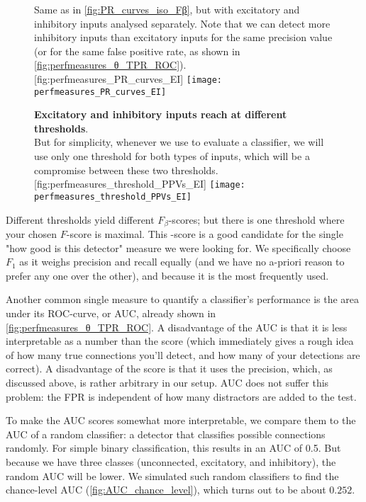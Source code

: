 \begin{figure}
    \begin{sidecaption}
        {Same as in \cref{fig:PR_curves_iso_Fβ}, but with excitatory and inhibitory inputs analysed separately. Note that we can detect more inhibitory inputs than excitatory inputs for the same precision value (or for the same false positive rate, as shown in \cref{fig:perfmeasures_θ_TPR_ROC}).}
        [fig:perfmeasures_PR_curves_EI]
        \texttt{[image: perfmeasures\_PR\_curves\_EI]}
    \end{sidecaption}
\end{figure}

\begin{figure}
    \begin{sidecaption}
        {\textbf{Excitatory and inhibitory inputs reach \maxF at different thresholds}.\\
        But for simplicity, whenever we use \maxF to evaluate a classifier, we will use only one threshold for both types of inputs, which will be a compromise between these two thresholds.}
        [fig:perfmeasures_threshold_PPVs_EI]
        \texttt{[image: perfmeasures\_threshold\_PPVs\_EI]}
    \end{sidecaption}
\end{figure}

Different thresholds yield different $F_β$-scores; but there is one threshold where your chosen $F$-score is maximal. This \maxF-score is a good candidate for the single "how good is this detector" measure we were looking for. We specifically choose $F_1$ as it weighs precision and recall equally (and we have no a-priori reason to prefer any one over the other), and because it is the most frequently used.

Another common single measure to quantify a classifier's performance is the area under its ROC-curve, or AUC, already shown in \cref{fig:perfmeasures_θ_TPR_ROC}. A disadvantage of the AUC is that it is less interpretable as a number than the \maxF score (which immediately gives a rough idea of how many true connections you'll detect, and how many of your detections are correct).
A disadvantage of the \maxF score is that it uses the precision, which, as discussed above, is rather arbitrary in our setup. AUC does not suffer this problem: the FPR is independent of how many distractors are added to the test.

To make the AUC scores somewhat more interpretable, we compare them to the AUC of a random classifier: a detector that classifies possible connections randomly. For simple binary classification, this results in an AUC of 0.5. But because we have three classes (unconnected, excitatory, and inhibitory), the random AUC will be lower. We simulated such random classifiers to find the chance-level AUC (\cref{fig:AUC_chance_level}), which turns out to be about $0.252$.

